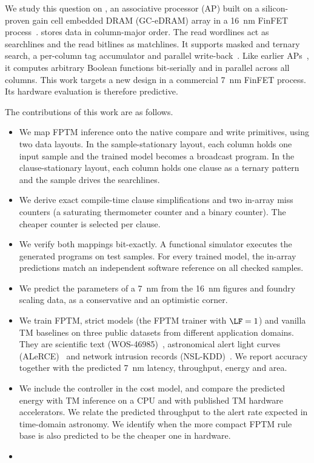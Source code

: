 We study this question on \gainp{}, an associative processor (AP) built on a silicon-proven gain cell embedded DRAM (GC-eDRAM) array in a 16~nm FinFET process~\cite{levi2026gainp}.
\gainp{} stores data in column-major order. The read wordlines act as searchlines and the read bitlines as matchlines. It supports masked and ternary search, a per-column tag accumulator and parallel write-back~\cite{levi2026gainp}.
Like earlier APs~\cite{yavits2015rap}, it computes arbitrary Boolean functions bit-serially and in parallel across all columns.
This work targets a new \gainp{} design in a commercial 7~nm FinFET process. Its hardware evaluation is therefore predictive.

The contributions of this work are as follows.
\begin{itemize}
    \item We map FPTM inference onto the native \gainp{} compare and write primitives, using two data layouts. In the sample-stationary layout, each column holds one input sample and the trained model becomes a broadcast program. In the clause-stationary layout, each column holds one clause as a ternary pattern and the sample drives the searchlines.
    \item We derive exact compile-time clause simplifications and two in-array miss counters (a saturating thermometer counter and a binary counter). The cheaper counter is selected per clause.
    \item We verify both mappings bit-exactly. A functional \gainp{} simulator executes the generated programs on test samples. For every trained model, the in-array predictions match an independent software reference on all checked samples.
    \item We predict the parameters of a 7~nm \gainp{} from the 16~nm \gainp{} figures and foundry scaling data, as a conservative and an optimistic corner.
    \item We train FPTM, strict models (the FPTM trainer with $\LF=1$) and vanilla TM baselines on three public datasets from different application domains. They are scientific text (WOS-46985)~\cite{kowsari2017hdltex}, astronomical alert light curves (ALeRCE)~\cite{sanchezsaez2021alerce} and network intrusion records (NSL-KDD)~\cite{tavallaee2009nslkdd}. We report accuracy together with the predicted 7~nm \gainp{} latency, throughput, energy and area.
    \item We include the controller in the cost model, and compare the predicted \gainp{} energy with TM inference on a CPU and with published TM hardware accelerators. We relate the predicted throughput to the alert rate expected in time-domain astronomy. We identify when the more compact FPTM rule base is also predicted to be the cheaper one in hardware.
    \item {}
\end{itemize}

